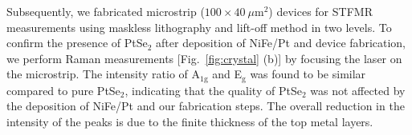 \documentclass[journal=jacsat,manuscript=article]{achemso}
\begin{document}
Subsequently, we fabricated microstrip ($100\times 40~\mu$m$^2$) devices for STFMR measurements using maskless lithography and lift-off method in two levels. To confirm the presence of PtSe$_{2}$ after deposition of NiFe/Pt and device fabrication, we perform Raman measurements [Fig.~\ref{fig:crystal} (b)] by focusing the laser on the microstrip. The intensity ratio of A$_\mathrm{1g}$ and E$_\mathrm{g}$ was found to be similar compared to pure PtSe$_{2}$, indicating that the quality of PtSe$_{2}$ was not affected by the deposition of NiFe/Pt and our fabrication steps. The overall reduction in the intensity of the peaks is due to the finite thickness of the top metal layers.


\end{document}
